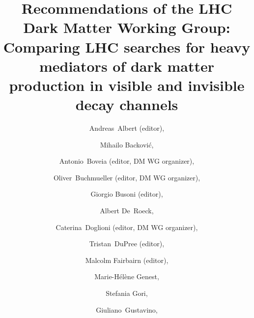 \documentclass[review]{elsarticle}
\begin{document}
\title{Recommendations of the LHC Dark Matter Working Group: Comparing LHC searches for heavy mediators of dark matter production in visible and invisible decay channels}



\author[1]{Andreas~Albert (editor),}
\address[1]{III. Physikalisches Institut A, RWTH Aachen University, Aachen, Germany}

\author[2]{Mihailo Backovi\'c,}
\address[2]{Center for Cosmology, Particle Physics and Phenomenology - CP3, Universite Catholique de Louvain, Louvain-la-neuve, Belgium}

\author[3]{Antonio~Boveia (editor, DM WG organizer),}
\address[3]{Ohio State University, 191 W. Woodruff Avenue, Columbus, OH 43210}

\author[4]{Oliver~Buchmueller (editor, DM WG organizer),}
\address[4]{High Energy Physics Group, Blackett Laboratory, Imperial College, Prince Consort Road, London, SW7 2AZ, United Kingdom}

\author[5]{Giorgio Busoni (editor),} 
\address[5]{ARC Centre of Excellence for Particle Physics at the Terascale, School of Physics, University of Melbourne, 3010, Australia}

\author[6,7]{Albert De~Roeck,}
\address[6]{Antwerp University, BÐ2610 Wilrijk, Belgium. }
\address[7]{CERN, EP Department, CH-1211 Geneva 23, Switzerland}

\author[8]{Caterina~Doglioni (editor, DM WG organizer),}
\address[8]{Fysiska institutionen, Lunds universitet, Lund, Sweden}

\author[9]{Tristan~DuPree (editor),}
\address[9]{Nikhef, Science Park 105, NL-1098 XG Amsterdam, The Netherlands}


\author[10]{Malcolm Fairbairn (editor),}
\address[10]{Physics, King's College London, Strand, London, WC2R 2LS, UK}

\author[11]{Marie-H\'{e}l\`{e}ne Genest,}
\address[11]{Laboratoire de Physique Subatomique et de Cosmologie, Universit\'{e} Grenoble-Alpes, CNRS/IN2P3, 53 rue des Martyrs, 38026 Grenoble Cedex, France}

\author[12]{Stefania Gori,}
\address[12]{Department of Physics, University of Cincinnati, Cincinnati, Ohio 45221, USA}

\author[13]{Giuliano~Gustavino,}
\address[13]{Universita' di Roma Sapienza, Piazza Aldo Moro, 2, 00185 Roma, Italy e INFN}
\end{document}
